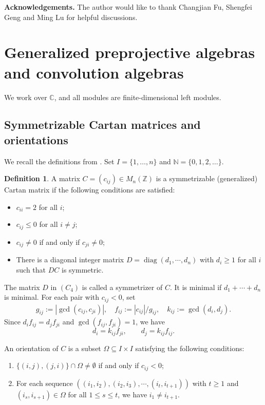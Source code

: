 \documentclass[12pt,reqno]{amsart}
\numberwithin{equation}{section}
\theoremstyle{definition}
\newtheorem{definition}[theorem]{Definition}
\theoremstyle{remark}
\newcommand{\C}{\mathbb C}
\newcommand{\N}{\mathbb N}
\newcommand{\diag}{\operatorname{diag}}
\theoremstyle{plain}
\theoremstyle{plain}
\begin{document}
\medskip
\noindent\textbf{Acknowledgements.}
The author would like to thank Changjian Fu, Shengfei Geng and Ming Lu for helpful discussions. 
\section{Generalized preprojective algebras and convolution algebras}
\label{sec:preliminaries}
We work over $\C$, and all modules are finite-dimensional left modules.
\subsection{Symmetrizable Cartan matrices and orientations}
    We recall the definitions from \cite{GLS17}. Set $I=\{1,\ldots,n\}$ and $\N=\{0,1,2,\ldots\}$.


    \begin{definition}A matrix $C = (c_{ij}) \in M_n(\mathbb{Z})$ is a symmetrizable (generalized) Cartan matrix if the following conditions are satisfied:
     \begin{itemize}
         \item[($C_1$)] $c_{ii} = 2$ for all $i$;
         \item[($C_2$)] $c_{ij} \leq 0$ for all $i \neq j$;
         \item[($C_3$)] $c_{ij} \neq 0$ if and only if $c_{ji} \neq 0$;
         \item[($C_4$)] There is a diagonal integer matrix $D = \diag(d_1,\cdots,d_n)$ with $d_i \geq 1$ for all $i$ such that $DC$ is symmetric.
     \end{itemize}
     \end{definition}
      The matrix $D$ in $(C_4)$ is called a symmetrizer of $C$. It is minimal if $d_1 +\cdots +d_n$ is minimal. For each pair with $c_{ij}<0$, set
     \begin{align*}
         g_{ij}:=|\gcd(c_{ij},c_{ji})|, \quad f_{ij}:=|c_{ij}|/g_{ij}, \quad k_{ij}:= \gcd(d_{i},d_{j}).
     \end{align*}
     Since $d_if_{ij}=d_jf_{ji}$ and $\gcd(f_{ij},f_{ji})=1$, we have
     \[
     d_i=k_{ij}f_{ji}, \qquad d_j=k_{ij}f_{ij}.
     \]

     An orientation of $C$ is a subset $\Omega \subseteq I\times I$ satisfying the following conditions:
     \begin{enumerate}[label=(\roman*)]
         \item $\{(i, j), (j, i)\} \cap \Omega \neq \emptyset $ if and only if $c_{ij} < 0$;
         \item For each sequence $((i_1, i_2), (i_2, i_3), \cdots , (i_t, i_{t+1}))$ with $t \geq 1$ and $(i_s, i_{s+1}) \in \Omega$ for all $1 \leq s \leq t$, we have $i_1 \neq i_{t+1}$.
     \end{enumerate}
\end{document}
